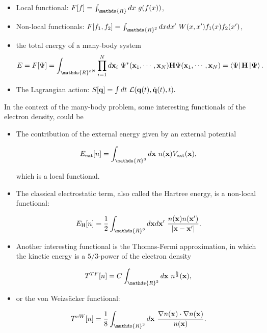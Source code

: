 \documentclass{homework}
\begin{document}
\begin{itemize}
    \item Local functional: $F[f] = \int_{\mathds{R}} dx \blanky g(f(x))$,
    \item Non-local functionals: 
    $F[f_1, f_2] =\int_{\mathds{R}^2} dx dx' \blanky W(x,x') f_1(x) f_2(x')$, 
    \item the total energy of a many-body system 
    $$
    E = F[\Psi] = \int_{\mathds{R}^{3N}} \prod_{i=1}^{N} d{\bf x}_i \blanky \Psi^{*}({\bf x}_1, \cdots, {\bf x}_N) {\bf H} \Psi({\bf x}_1, \cdots, {\bf x}_N) = \bra{\Psi}{\bf H}\ket{\Psi}.
    $$
    \item The Lagrangian action: $
    S[{\bf q}] = \int dt \textnormal{ } \mathcal{L}({\bf q}(t), \dot{\bf q}(t), t).$
\end{itemize}

In the context of the many-body problem, some interesting functionals of the electron density, could be 

\begin{itemize}
    \item The contribution of the external energy given by an external potential
    
    $$
    E_{\textnormal{ext}}[n] = \int_{\mathds{R}^3} d{\bf x}  \blanky n({\bf x}) V_{\textnormal{ext}}({\bf x}),
    $$
    
    which is a local functional.
    \item The classical electrostatic term, also called the Hartree energy, is a non-local functional:
    
    $$
    E_{\textnormal{H}}[n] = \frac{1}{2} \int_{\mathds{R}^6} d{\bf x} d{\bf x}' \blanky \frac{n({\bf x})n({\bf x'})}{|{\bf x}-{\bf x}'|}.
    $$
    
    \item Another interesting functional is the Thomas-Fermi approximation, in which the kinetic energy is a $5/3$-power of the electron density
    
    $$
    T^{TF}[n] = C \int_{\mathds{R}^3} d{\bf x} \blanky n^{\frac{5}{3}}({\bf x}),
    $$
    
    \item or the von Weizs\"acker functional:
    
    $$
    T^{vW}[n] = \frac{1}{8} \int_{\mathds{R}^3} d{\bf x} \blanky \frac{\nabla n({\bf x}) \cdot \nabla n({\bf x})}{n({\bf x})}. 
    $$
\end{itemize}

\blanky \\
\end{document}
